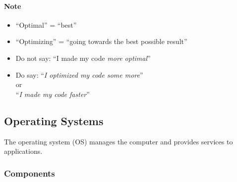 \documentclass[12pt]{article}
\begin{document}
\paragraph{Note}
\begin{itemize}
    \item ``Optimal'' = ``best''
    \item ``Optimizing'' = ``going towards the best possible result''
    
    \item Do not say: ``I made my code \textit{more optimal}''
    \item Do say: ``\textit{I optimized my code some more}'' \\
    or \\
    ``\textit{I made my code faster}''
\end{itemize}






\subsection{Operating Systems}

The operating system (OS) manages the computer and provides services to applications.

\subsubsection{Components}
\end{document}
